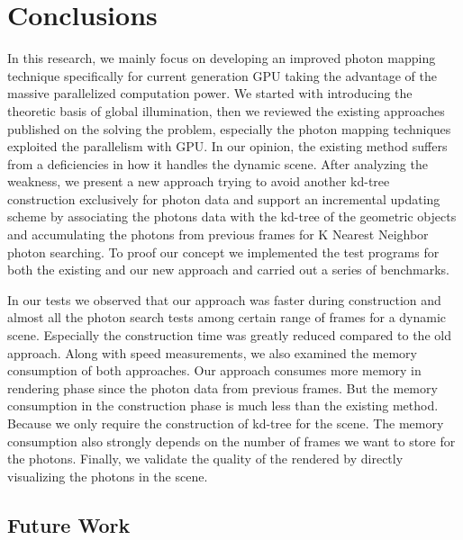 \chapter{Conclusions}

In this research, we mainly focus on developing an improved photon mapping technique specifically for current generation GPU taking the advantage of the massive parallelized computation power. We started with introducing the theoretic basis of global illumination, then we reviewed the existing approaches published on the solving the problem, especially the photon mapping techniques exploited the parallelism with GPU. In our opinion, the existing method suffers from a deficiencies in how it handles the dynamic scene. After analyzing the weakness, we present a new approach trying to avoid another kd-tree construction exclusively for photon data and support an incremental updating scheme by associating the photons data with the kd-tree of the geometric objects and accumulating the photons from previous frames for K Nearest Neighbor photon searching. To proof our concept we implemented the test programs for both the existing and our new approach and carried out a series of benchmarks.


In our tests we observed that our approach was faster during construction and almost all the photon search tests among certain range of frames for a dynamic scene. Especially the construction time was greatly reduced compared to the old approach. Along with speed measurements, we also examined the memory consumption of both approaches. Our approach consumes more memory in rendering phase since the photon data from previous frames. But the memory consumption in the construction phase is much less than the existing method. Because we only require the construction of kd-tree for the scene. The memory consumption also strongly depends on the number of frames we want to store for the photons. Finally, we validate the quality of the rendered by directly visualizing the photons in the scene.

\section{Future Work}

